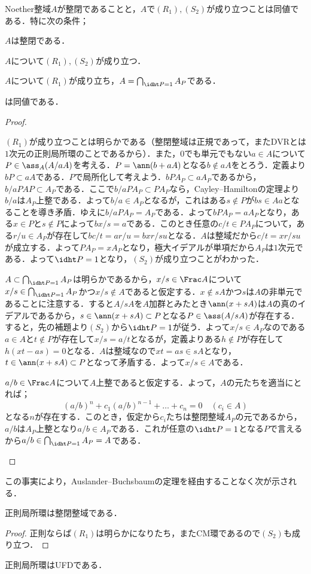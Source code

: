 \begin{thm}
	Noether整域$A$が整閉であることと，$A$で$(R_1),(S_2)$が成り立つことは同値である．特に次の条件；
	\begin{sakura}
		\item $A$は整閉である．
		\item $A$について$(R_1),(S_2)$が成り立つ．
		\item $A$について$(R_1)$が成り立ち，$A=\bigcap_{\idht P=1}A_P$である．
	\end{sakura}
	は同値である．
\end{thm}

\begin{proof}
	\begin{eqv}[3]
		\item $(R_1)$が成り立つことは明らかである（整閉整域は正規であって，またDVRとは$1$次元の正則局所環のことであるから）．また，$0$でも単元でもない$a\in A$について$P\in\ass_A (A/aA)$を考える．$P=\ann (b+aA)$となる$b\not\in aA$をとろう．定義より$bP\subset aA$である．$P$で局所化して考えよう．$bPA_P\subset aA_P$であるから，$b/aPAP\subset A_P$である．ここで$b/aPA_P\subset PA_P$なら，Cayley--Hamiltonの定理より$b/a$は$A_P$上整である．よって$b/a\in A_P$となるが，これはある$s\not\in P$が$bs\in Aa$となることを導き矛盾．ゆえに$b/aPA_P=A_P$である．よって$bPA_P=aA_P$となり，ある$x\in P$と$s\not\in P$によって$bx/s=a$である．このとき任意の$c/t\in PA_P$について，ある$r/u\in A_P$が存在して$bc/t=ar/u=bxr/su$となる．$A$は整域だから$c/t=xr/su$が成立する．よって$PA_P=xA_P$となり，極大イデアルが単項だから$A_P$は$1$次元である．よって$\idht P=1$となり，$(S_2)$が成り立つことがわかった．
		\item $A\subset\bigcap_{\idht P=1}A_P$は明らかであるから，$x/s\in\Frac A$について$x/s\in\bigcap_{\idht P=1} A_P$かつ$x/s\not\in A$であると仮定する．$x\not\in sA$かつ$s$は$A$の非単元であることに注意する．すると$A/sA$を$A$加群とみたとき$\ann (x+sA)$は$A$の真のイデアルであるから，$s\in\ann(x+sA)\subset P$となる$P\in\ass (A/sA)$が存在する．すると，先の補題より$(S_2)$から$\idht P=1$が従う．よって$x/s\in A_P$なのである$a\in A$と$t\not\in P$が存在して$x/s=a/t$となるが，定義よりある$h\not\in P$が存在して$h(xt-as)=0$となる．$A$は整域なので$xt=as\in sA$となり，$t\in\ann(x+sA)\subset P$となって矛盾する．よって$x/s\in A$である．
		\item $a/b\in\Frac A$について$A$上整であると仮定する．よって，$A$の元たちを適当にとれば；
		\[(a/b)^n+c_1(a/b)^{n-1}+\dots+c_n=0\quad(c_i\in A)\]
		となる$n$が存在する．このとき，仮定から$c_i$たちは整閉整域$A_P$の元であるから，$a/b$は$A_P$上整となり$a/b\in A_P$である．これが任意の$\idht P=1$となる$P$で言えるから$a/b\in\bigcap_{\idht P=1}A_P=A$である．
	\end{eqv}
\end{proof}

この事実により，Auslander--Buchsbaumの定理を経由することなく次が示される．
\begin{cor}
	正則局所環は整閉整域である．
\end{cor}

\begin{proof}
	正則ならば$(R_1)$は明らかになりたち，またCM環であるので$(S_2)$も成り立つ．
\end{proof}

\begin{thm}
	正則局所環はUFDである．
\end{thm}